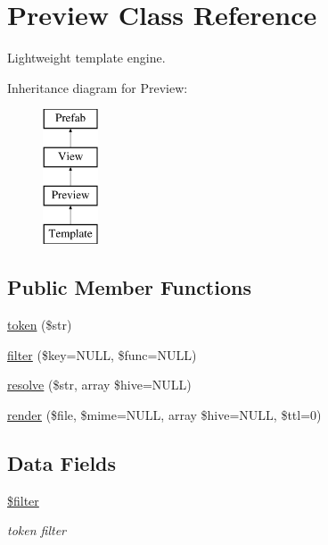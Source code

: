 \hypertarget{class_preview}{}\section{Preview Class Reference}
\label{class_preview}


Lightweight template engine.  


Inheritance diagram for Preview\+:\begin{figure}[H]
\begin{center}
\leavevmode
\includegraphics[height=4.000000cm]{class_preview}
\end{center}
\end{figure}
\subsection*{Public Member Functions}
\begin{DoxyCompactItemize}
\item 
\hyperlink{class_preview_a0a17b08b524058f3c3ce29d0985e83d6}{token} (\$str)
\item 
\hyperlink{class_preview_a739f9f012ec41e9b6ff99e88224f8c20}{filter} (\$key=N\+U\+LL, \$func=N\+U\+LL)
\item 
\hyperlink{class_preview_a2cc65dc50e9cabc431c6336705fd69eb}{resolve} (\$str, array \$hive=N\+U\+LL)
\item 
\hyperlink{class_preview_acddff385bc789c026a8530465c8c10ed}{render} (\$file, \$mime=N\+U\+LL, array \$hive=N\+U\+LL, \$ttl=0)
\end{DoxyCompactItemize}
\subsection*{Data Fields}
\begin{DoxyCompactItemize}
\item 
\hyperlink{class_preview_aac53bdb48bdd96ff9c20e2a86f48ce5f}{\$filter}
\begin{DoxyCompactList}\small\item\em token filter \end{DoxyCompactList}\end{DoxyCompactItemize}
